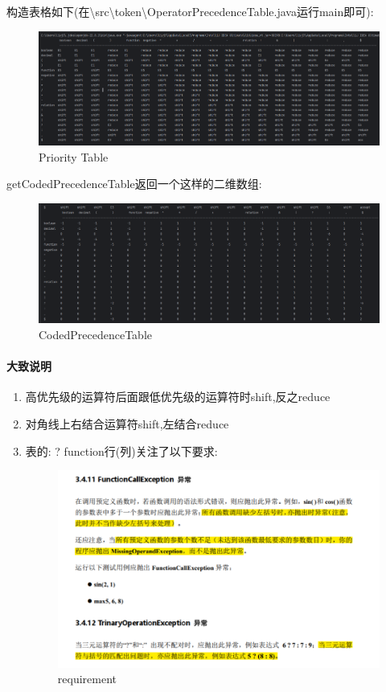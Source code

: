\documentclass{article}
\begin{document}
构造表格如下(在\textbackslash src\textbackslash token\textbackslash OperatorPrecedenceTable.java运行main即可):
\begin{figure}[H]
    \centering
    \includegraphics[width=\linewidth]{Priority.png}
    \caption{Priority Table}
    \label{fig:Priority}
\end{figure}
\newpage
getCodedPrecedenceTable返回一个这样的二维数组:
\begin{figure}[H]
    \centering
    \includegraphics[width=\linewidth]{CodedP.png}
    \caption{CodedPrecedenceTable}
    \label{fig:CodedP}
\end{figure}
\paragraph{大致说明}

\begin{enumerate}
    \item 高优先级的运算符后面跟低优先级的运算符时shift,反之reduce

    \item 对角线上右结合运算符shift,左结合reduce

    \item 表的: ? function行(列)关注了以下要求:
          \begin{figure}[H]
              \centering
              \includegraphics[width=\linewidth]{require.png}
              \caption{requirement}
              \label{fig:require}
          \end{figure}

\end{enumerate}
\newpage
\end{document}
